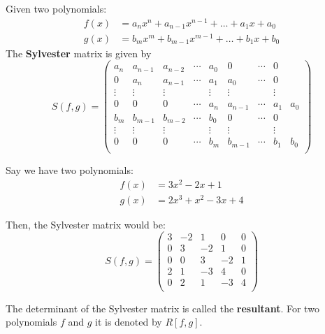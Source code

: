 \documentclass[12pt, a4paper]{article}
\begin{document}
\begin{definition}
    Given two polynomials:
\[\begin{aligned}
    f(x) &= a_nx^n + a_{n-1}x^{n-1} + \ldots + a_1x + a_0 \\
    g(x) &= b_mx^m + b_{m-1}x^{m-1} + \ldots + b_1x + b_0
\end{aligned}\]
The \textbf{Sylvester} matrix is given by 
\[S(f,g) = 
    \left(
    \begin{array}{ccccccccc}
    a_n & a_{n-1} & a_{n-2} & \cdots & a_0 & 0 & \cdots & 0 \\
    0 & a_n & a_{n-1} & \cdots & a_1 & a_0 & \cdots & 0 \\
    \vdots & \vdots & \vdots & & \vdots & \vdots & & \vdots \\
    0 & 0 & 0 & \cdots & a_n & a_{n-1} & \cdots & a_1 & a_0 \\
    b_m & b_{m-1} & b_{m-2} & \cdots & b_0 & 0 & \cdots & 0 \\
    \vdots & \vdots & \vdots & & \vdots & \vdots & & \vdots \\
    0 & 0 & 0 & \cdots & b_m & b_{m-1} & \cdots & b_1 & b_0 \\
    \end{array}
    \right)
    \]
\end{definition}

\begin{mdexample}
    Say we have two polynomials:
\[\begin{aligned}
    f(x) &= 3x^2 - 2x + 1 \\
    g(x) &= 2x^3 + x^2 - 3x + 4
\end{aligned}\]

Then, the Sylvester matrix would be:
\[
S(f, g) = \begin{pmatrix}
    3 & -2 & 1 & 0 & 0 \\
    0 & 3 & -2 & 1 & 0 \\
    0 & 0 & 3 & -2 & 1 \\
    2 & 1 & -3 & 4 & 0 \\
    0 & 2 & 1 & -3 & 4 \\
\end{pmatrix}
\]
\end{mdexample}

\begin{definition}
    The determinant of the Sylvester matrix is called the \textbf{resultant}. For two polynomials \(f\) and \(g\) it is denoted by \(R[f,g]\).
\end{definition}
\end{document}
